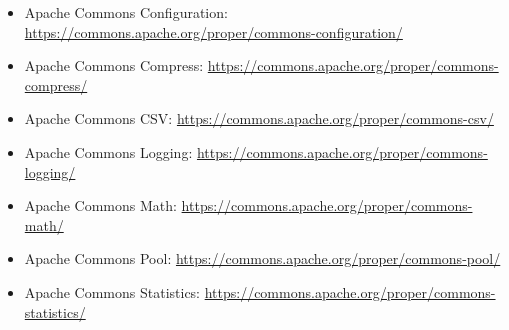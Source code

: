 \begin{itemize}
    \item Apache Commons Configuration: \url{https://commons.apache.org/proper/commons-configuration/}
    \item Apache Commons Compress: \url{https://commons.apache.org/proper/commons-compress/}
    \item Apache Commons CSV: \url{https://commons.apache.org/proper/commons-csv/}
    \item Apache Commons Logging: \url{https://commons.apache.org/proper/commons-logging/}
    \item Apache Commons Math: \url{https://commons.apache.org/proper/commons-math/}
    \item Apache Commons Pool: \url{https://commons.apache.org/proper/commons-pool/}
    \item Apache Commons Statistics: \url{https://commons.apache.org/proper/commons-statistics/}
\end{itemize}